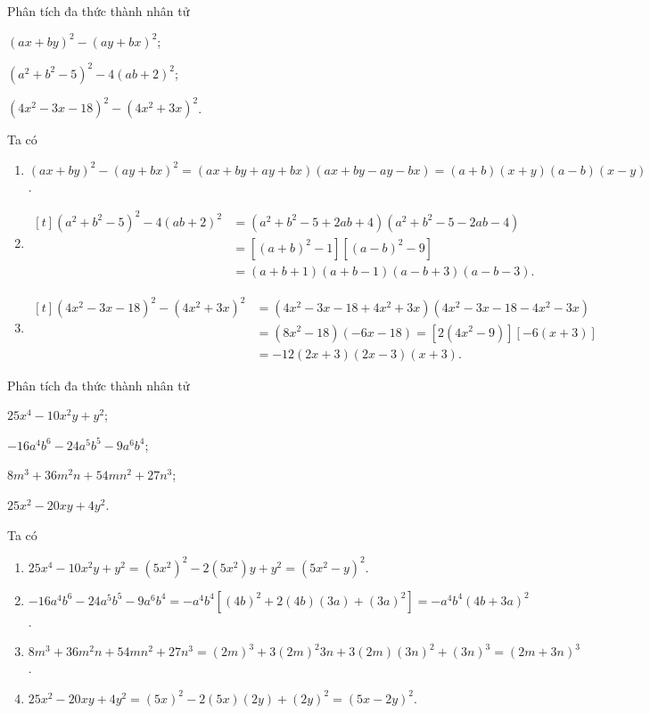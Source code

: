 \begin{vn}
	Phân tích đa thức thành nhân tử
	\begin{listEX}[2]
		\item $(ax+by)^2 - (ay + bx)^2$;
		\item $\left(a^2 + b^2 - 5\right)^2 - 4(ab+2)^2$;
		\item $\left(4x^2 - 3x - 18\right)^2 - \left(4x^2 + 3x\right)^2$.
	\end{listEX}
	\loigiai
	{
		Ta có
		\begin{enumerate}
			\item $(ax+by)^2 - (ay + bx)^2 = (ax + by + ay + bx)(ax + by - ay - bx) = (a+b)(x+y)(a-b)(x-y)$.
			\item 
			{\allowdisplaybreaks
				$\begin{aligned}[t]
					\left(a^2 + b^2 - 5\right)^2 - 4(ab+2)^2 &= \left(a^2 + b^2 - 5 + 2ab + 4\right)\left(a^2 + b^2 - 5 - 2ab - 4\right) \\
					&= \left[(a+b)^2 - 1\right]\left[(a-b)^2 - 9\right] \\
					&= (a+b+1)(a+b-1)(a-b+3)(a-b-3).
				\end{aligned}$
			}
			\item 
			{\allowdisplaybreaks
				$\begin{aligned}[t]
					\left(4x^2 - 3x - 18\right)^2 - \left(4x^2 + 3x\right)^2 &= \left(4x^2 - 3x - 18 + 4x^2 + 3x\right)\left(4x^2 - 3x - 18 - 4x^2 - 3x\right) \\
					&= \left(8x^2 - 18\right)\left(-6x-18\right) = \left[2\left(4x^2 - 9\right)\right]\left[-6(x+3)\right] \\ 
					&= -12(2x+3)(2x-3)(x+3).
				\end{aligned}$
			}
		\end{enumerate}
	}
\end{vn}

\begin{vn}
	Phân tích đa thức thành nhân tử
	\begin{listEX}[2]
		\item $25x^4 - 10x^2y + y^2$;
		\item $-16a^4b^6 - 24a^5b^5 - 9a^6b^4$;
		\item $8m^3 + 36m^2n + 54mn^2 + 27n^3$;
		\item $25x^2 - 20xy + 4y^2$.
	\end{listEX}
	\loigiai 
	{
		Ta có 
		\begin{enumerate}
			\item $25x^4 - 10x^2y + y^2 = \left(5x^2\right)^2 - 2\left(5x^2\right)y + y^2 = \left(5x^2 - y\right)^2$.
			\item $-16a^4b^6 - 24a^5b^5 - 9a^6b^4 = -a^4b^4 \left[(4b)^2 + 2(4b)(3a)+ (3a)^2\right] = -a^4b^4(4b+3a)^2$.
			\item $8m^3 + 36m^2n + 54mn^2 + 27n^3 = (2m)^3 + 3(2m)^2 3n + 3(2m)(3n)^2 + (3n)^3 = (2m+3n)^3$.
			\item $25x^2 - 20xy + 4y^2 = (5x)^2 - 2(5x)(2y) + (2y)^2 = (5x-2y)^2$.
		\end{enumerate}
	}
\end{vn}

